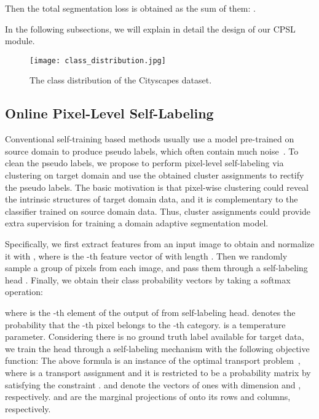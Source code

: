 \documentclass[10pt,twocolumn,letterpaper]{article}
\begin{document}
	Then the total segmentation loss  is obtained as the sum of them: .
	
	In the following subsections, we will explain in detail the design of our CPSL module.
	\begin{figure}
		\centering
		\texttt{[image: class\_distribution.jpg]}\\\vspace{-1.0em}
		\caption{The class distribution of the Cityscapes dataset. }
		\label{fig2}
		\vspace{-1.0em}
	\end{figure}
	\subsection{Online Pixel-Level Self-Labeling}
	\label{sec3.2}
	 Conventional self-training based methods usually use a model pre-trained on source domain to produce pseudo labels, which often contain much noise~\cite{zou2018domain,zou2019confidence,zhang2019category}. To clean the pseudo labels, we propose to perform pixel-level self-labeling via clustering on target domain and use the obtained cluster assignments to rectify the pseudo labels. The basic motivation is that pixel-wise clustering could reveal the intrinsic structures of target domain data, and it is complementary to the classifier trained on source domain data. Thus, cluster assignments could provide extra supervision for training a domain adaptive segmentation model. 
	
	Specifically, we first extract features from an input image to obtain  and normalize it with , where  is the -th feature vector of  with length . Then we randomly sample a group of pixels  from each image, and pass them through a self-labeling head . Finally, we obtain their class probability vectors  by taking a softmax operation: 
	
	where  is the -th element of the output of  from self-labeling head.  denotes the probability that the -th pixel belongs to the -th category.  is a temperature parameter. Considering there is no ground truth label available for target data, we train the head  through a self-labeling mechanism \cite{asano2020self} with the following objective function:
	{\small 
		}The above formula is an instance of the optimal transport problem~\cite{cuturi2013sinkhorn}, where  is a transport assignment and it is restricted to be a probability matrix by satisfying the constraint .   and  denote the vectors of ones with dimension  and , respectively.  and  are the marginal projections of  onto its rows and columns, respectively. 
\end{document}
